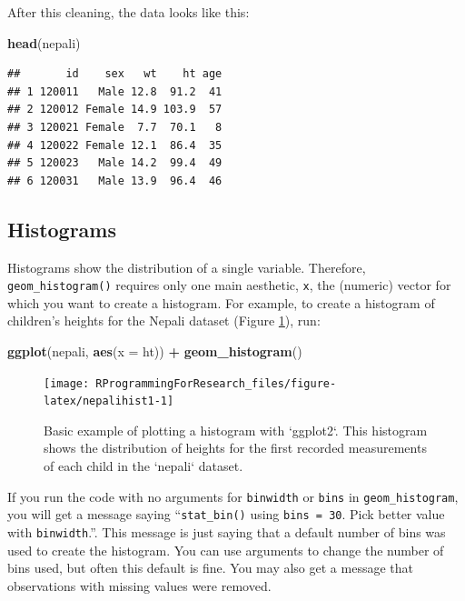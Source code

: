\documentclass[]{book}
\makeatletter
\newenvironment{Shaded}{\begin{snugshade}}{\end{snugshade}}
\newcommand{\KeywordTok}[1]{\textcolor[rgb]{0.13,0.29,0.53}{\textbf{#1}}}
\newcommand{\DataTypeTok}[1]{\textcolor[rgb]{0.13,0.29,0.53}{#1}}
\newcommand{\StringTok}[1]{\textcolor[rgb]{0.31,0.60,0.02}{#1}}
\newcommand{\OperatorTok}[1]{\textcolor[rgb]{0.81,0.36,0.00}{\textbf{#1}}}
\newcommand{\NormalTok}[1]{#1}
\newenvironment{kframe}{%
\medskip{}
\setlength{\fboxsep}{.8em}
 \def\at@end@of@kframe{}%
 \ifinner\ifhmode%
  \def\at@end@of@kframe{\end{minipage}}%
  \begin{minipage}{\columnwidth}%
 \fi\fi%
 \def\FrameCommand##1{\hskip\@totalleftmargin \hskip-\fboxsep
 \colorbox{shadecolor}{##1}\hskip-\fboxsep
     \hskip-\linewidth \hskip-\@totalleftmargin \hskip\columnwidth}%
 \MakeFramed {\advance\hsize-\width
   \@totalleftmargin\z@ \linewidth\hsize
   \@setminipage}}%
 {\par\unskip\endMakeFramed%
 \at@end@of@kframe}
\renewenvironment{Shaded}{\begin{kframe}}{\end{kframe}}
\newenvironment{rmdblock}[1]
  {
  \begin{itemize}
  \renewcommand{\labelitemi}{
    \raisebox{-.7\height}[0pt][0pt]{
      {\setkeys{Gin}{width=3em,keepaspectratio}\texttt{[image: images/\#1]}}
    }
  }
  \setlength{\fboxsep}{1em}
  \begin{kframe}
  \item
  }
  {
  \end{kframe}
  \end{itemize}
  }
\newenvironment{rmdnote}
  {\begin{rmdblock}{note}}
  {\end{rmdblock}}
\theoremstyle{definition}
\theoremstyle{definition}
\theoremstyle{definition}
\theoremstyle{remark}
\makeatother
\begin{document}
After this cleaning, the data looks like this:

\begin{Shaded}
\begin{Highlighting}[]
\KeywordTok{head}\NormalTok{(nepali)}
\end{Highlighting}
\end{Shaded}

\begin{verbatim}
##       id    sex   wt    ht age
## 1 120011   Male 12.8  91.2  41
## 2 120012 Female 14.9 103.9  57
## 3 120021 Female  7.7  70.1   8
## 4 120022 Female 12.1  86.4  35
## 5 120023   Male 14.2  99.4  49
## 6 120031   Male 13.9  96.4  46
\end{verbatim}

\subsection{Histograms}\label{histograms}

Histograms show the distribution of a single variable. Therefore,
\texttt{geom\_histogram()} requires only one main aesthetic, \texttt{x},
the (numeric) vector for which you want to create a histogram. For
example, to create a histogram of children's heights for the Nepali
dataset (Figure \ref{fig:nepalihist1}), run:

\begin{Shaded}
\begin{Highlighting}[]
\KeywordTok{ggplot}\NormalTok{(nepali, }\KeywordTok{aes}\NormalTok{(}\DataTypeTok{x =}\NormalTok{ ht)) }\OperatorTok{+}\StringTok{ }
\StringTok{  }\KeywordTok{geom_histogram}\NormalTok{()}
\end{Highlighting}
\end{Shaded}

\begin{figure}

{\centering \texttt{[image: RProgrammingForResearch\_files/figure-latex/nepalihist1-1]} 

}

\caption{Basic example of plotting a histogram with `ggplot2`. This histogram shows the distribution of heights for the first recorded measurements of each child in the `nepali` dataset.}\label{fig:nepalihist1}
\end{figure}

\begin{rmdnote}
If you run the code with no arguments for \texttt{binwidth} or
\texttt{bins} in \texttt{geom\_histogram}, you will get a message saying
``\texttt{stat\_bin()} using \texttt{bins\ =\ 30}. Pick better value
with \texttt{binwidth}.''. This message is just saying that a default
number of bins was used to create the histogram. You can use arguments
to change the number of bins used, but often this default is fine. You
may also get a message that observations with missing values were
removed.
\end{rmdnote}
\end{document}
